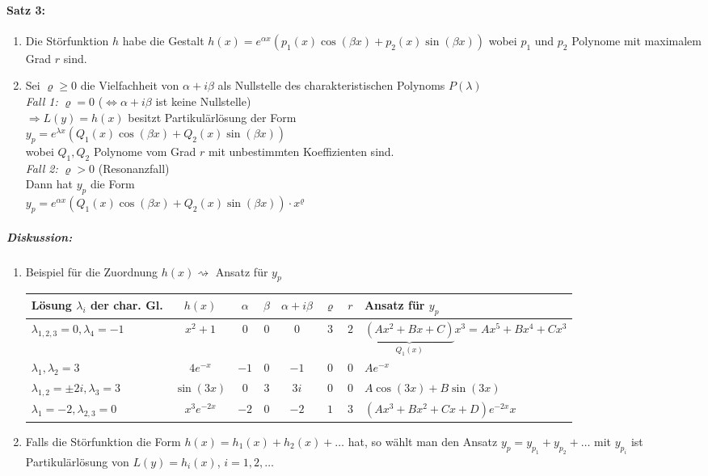\paragraph{Satz 3:} 
\begin{enumerate}
\item Die Störfunktion $h$ habe die Gestalt $h(x) = e^{\alpha x}(p_1(x) \cos (\beta x) + p_2 (x) \sin (\beta x))$ wobei $p_1$  und $p_2$ Polynome mit maximalem Grad $r$ sind. 
\item Sei $\varrho \geq 0$ die Vielfachheit von $\alpha + i \beta$ als Nullstelle des charakteristischen Polynoms $P(\lambda)$\\
\emph{Fall 1:} $\varrho=0$ ($\Leftrightarrow \alpha + i \beta$ ist keine Nullstelle)\\
$\Rightarrow L(y)=h(x)$ besitzt Partikulärlösung der Form\\
$\boxed{y_p=e^{\lambda x} (Q_1 (x) \cos (\beta x) + Q_2(x) \sin (\beta x))}$\\
wobei $Q_1, Q_2$ Polynome vom Grad $r$ mit unbestimmten Koeffizienten sind.\\
\emph{Fall 2:} $\varrho >0$ (Resonanzfall)\\
Dann hat $y_p$ die Form\\
$\boxed{y_p=e^{\alpha x}(Q_1(x) \cos (\beta x) + Q_2(x) \sin (\beta x)) \cdot x^\varrho}$
\end{enumerate}
\subparagraph{Diskussion:}
\begin{enumerate}
\item Beispiel für die Zuordnung $h(x) \rightsquigarrow$ Ansatz für $y_p$\\
\begin{tabular}{l | c | c | c | c | c | c | l }
Lösung $\lambda_i$ der char. Gl. & $h(x)$ & $\alpha$ & $\beta$ & $\alpha + i\beta$ & $\varrho$  & $r$& Ansatz für $y_p$\\
\hline
$\lambda_{1,2,3}=0, \lambda_4=-1$ & $x^2+1$ & $0$ & $0$ & $0$ & $3$ & $2$ & $\underbrace{(Ax^2+Bx+C)}_{Q_1(x)}x^3=Ax^5+Bx^4+Cx^3$ \\
$\lambda_1, \lambda_2 = 3$ & $4e^{-x}$ & $-1$ & $0$ & $-1$ & $0$ & $0$ & $Ae^{-x}$\\
$\lambda_{1,2}=\pm 2 i , \lambda_3=3$ & $\sin(3x)$ & $0$ & $3$ & $3i$ & $0$ & $0$ & $A \cos (3x)+B\sin(3x)$\\
$\lambda_1 = -2, \lambda_{2,3}=0$ & $x^3e^{-2x}$ & $-2$ & $0$ & $-2$ & $1$ & $3$ & $(Ax^3+Bx^2+Cx+D)e^{-2x} x$
\end{tabular}
\item Falls die Störfunktion die Form $h(x)=h_1(x) + h_2(x) + \dots $ hat, so wählt man den Ansatz $y_p=y_{p_1}+y_{p_2}+\dots$ mit $y_{p_i}$ ist Partikulärlösung von $L(y)=h_i(x)$, $i=1,2,\dots$
\end{enumerate}
